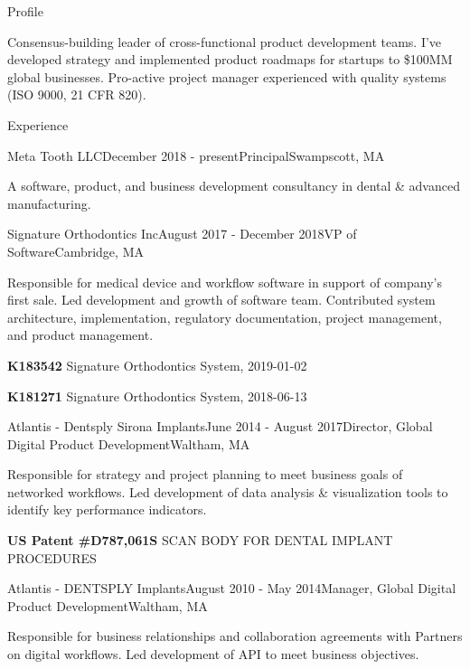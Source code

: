 \documentclass{resume}
\begin{document}
  
\begin{rSection}{Profile}
\item Consensus-building leader of cross-functional product development teams. I've developed strategy and implemented product roadmaps for startups to \$100MM global businesses. Pro-active project manager experienced with quality systems (ISO 9000, 21 CFR 820).
\end{rSection}

\begin{rSection}{Experience}

\begin{rSubsection}{Meta Tooth LLC}{December 2018 - present}{Principal}{Swampscott, MA}
\item A software, product, and business development consultancy in dental \& advanced manufacturing.
\end{rSubsection}

\begin{rSubsection}{Signature Orthodontics Inc}{August 2017 - December 2018}{VP of Software}{Cambridge, MA}
\item Responsible for medical device and workflow software in support of company's first sale.  Led development and growth of software team. Contributed system architecture, implementation, regulatory documentation, project management, and product management.
\item \textbf{K183542} Signature Orthodontics System, 2019-01-02
\item \textbf{K181271} Signature Orthodontics System, 2018-06-13
\end{rSubsection}


\begin{rSubsection}{Atlantis - Dentsply Sirona Implants}{June 2014 - August 2017}{Director, Global Digital Product Development}{Waltham, MA}
\item Responsible for strategy and project planning to meet business goals of networked workflows.  Led development of data analysis \& visualization tools to identify key performance indicators.
\item \textbf{US Patent \#D787,061S} SCAN BODY FOR DENTAL IMPLANT PROCEDURES
\end{rSubsection}

\begin{rSubsection}{Atlantis - DENTSPLY Implants}{August 2010 - May 2014}{Manager, Global Digital Product Development}{Waltham, MA}
\item Responsible for business relationships and collaboration agreements with Partners on digital workflows.  Led development of API to meet business objectives.
\end{rSubsection}



\end{rSection}
\end{document}
